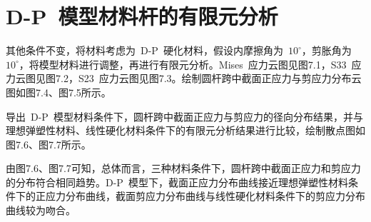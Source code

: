 \chapter{D-P~模型材料杆的有限元分析}
\label{cha:DP}
其他条件不变，将材料考虑为~D-P~硬化材料，假设内摩擦角为~{$10^\circ$}，剪胀角为~{$10^\circ$}，将模型材料进行调整，再进行有限元分析。Mises~应力云图见图7.1，S33~应力云图见图7.2，S23~应力云图见图7.3。绘制圆杆跨中截面正应力与剪应力分布云图如图7.4、图7.5所示。

导出~D-P~模型材料条件下，圆杆跨中截面正应力与剪应力的径向分布结果，并与理想弹塑性材料、线性硬化材料条件下的有限元分析结果进行比较，绘制散点图如图7.6、图7.7所示。

由图7.6、图7.7可知，总体而言，三种材料条件下，圆杆跨中截面正应力和剪应力的分布符合相同趋势。D-P~模型下，截面正应力分布曲线接近理想弹塑性材料条件下的正应力分布曲线，截面剪应力分布曲线与线性硬化材料条件下的剪应力分布曲线较为吻合。